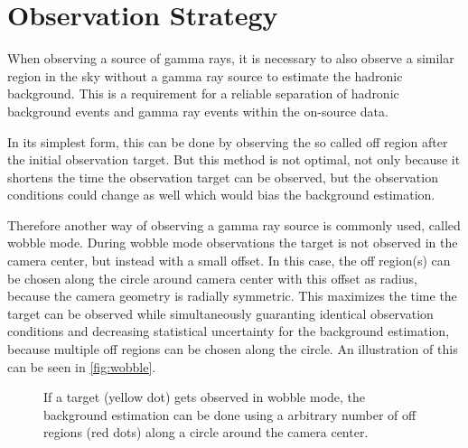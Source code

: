 \section{Observation Strategy}
\label{sec:wobble}
When observing a source of gamma rays, it is necessary to also observe a similar region in the sky without a gamma ray source to estimate the hadronic background.
This is a requirement for a reliable separation of hadronic background events and gamma ray events within the on-source data.

In its simplest form, this can be done by observing the so called off region after the initial observation target.
But this method is not optimal, not only because it shortens the time the observation target can be observed, but the observation conditions could
change as well which would bias the background estimation.

Therefore another way of observing a gamma ray source is commonly used, called wobble mode.
During wobble mode observations the target is not observed in the camera center, but instead with a small offset.
In this case, the off region(s) can be chosen along the circle around camera center with this offset as radius, because the camera geometry is radially symmetric.
This maximizes the time the target can be observed while simultaneously guaranting identical observation conditions and decreasing statistical uncertainty 
for the background estimation, because multiple off regions can be chosen along the circle.
An illustration of this can be seen in \autoref{fig:wobble}.

\begin{figure}
    \centering
    \caption{If a target (yellow dot) gets observed in wobble mode, the background estimation can be done using a arbitrary number of off regions 
        (red dots) along a circle around the camera center.
    }
    \label{fig:wobble}
\end{figure}

